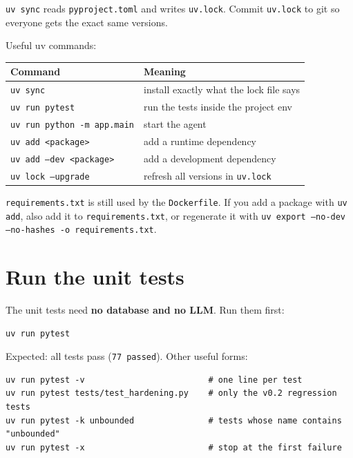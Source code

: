 \documentclass[11pt,a4paper]{article}
\newcommand{\note}[1]{%
  \par\smallskip\noindent\colorbox{warnbg}{\parbox{\dimexpr\linewidth-2\fboxsep}{\small #1}}\par\smallskip}
\begin{document}
\texttt{uv sync} reads \texttt{pyproject.toml} and writes \texttt{uv.lock}.
Commit \texttt{uv.lock} to git so everyone gets the exact same versions.

Useful uv commands:

\begin{center}
\begin{tabular}{@{}ll@{}}
\toprule
\textbf{Command} & \textbf{Meaning} \\
\midrule
\texttt{uv sync}                   & install exactly what the lock file says \\
\texttt{uv run pytest}             & run the tests inside the project env \\
\texttt{uv run python -m app.main} & start the agent \\
\texttt{uv add <package>}          & add a runtime dependency \\
\texttt{uv add --dev <package>}    & add a development dependency \\
\texttt{uv lock --upgrade}         & refresh all versions in \texttt{uv.lock} \\
\bottomrule
\end{tabular}
\end{center}

\note{\texttt{requirements.txt} is still used by the \texttt{Dockerfile}.
If you add a package with \texttt{uv add}, also add it to
\texttt{requirements.txt}, or regenerate it with
\texttt{uv export --no-dev --no-hashes -o requirements.txt}.}

\section{Run the unit tests}

The unit tests need \textbf{no database and no LLM}. Run them first:

\begin{lstlisting}
uv run pytest
\end{lstlisting}

Expected: all tests pass (\texttt{77 passed}). Other useful forms:

\begin{lstlisting}
uv run pytest -v                         # one line per test
uv run pytest tests/test_hardening.py    # only the v0.2 regression tests
uv run pytest -k unbounded               # tests whose name contains "unbounded"
uv run pytest -x                         # stop at the first failure
\end{lstlisting}
\end{document}
